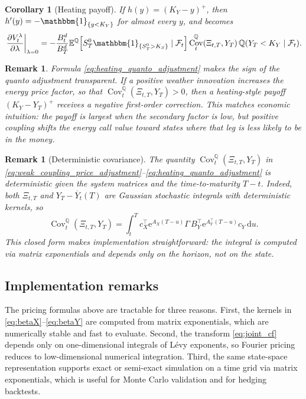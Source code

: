 \documentclass[10pt,a4paper,reqno]{amsart}
\newtheorem{corollary}[theorem]{Corollary}
\newtheorem{remark}[theorem]{Remark}
\newcommand{\E}{\mathbb{E}}
\newcommand{\Q}{\mathbb{Q}}
\newcommand{\F}{\mathcal{F}}
\newcommand{\1}{\mathbbm{1}}
\newcommand{\dd}{\mathrm{d}}
\newcommand{\ee}{\mathrm{e}}
\DeclareMathOperator{\Cov}{Cov}
\begin{document}
\begin{corollary}[Heating payoff]
\label{cor:heating_quanto}
If \(h(y)=(K_Y-y)^+\), then \(h'(y)=-\1_{\{y<K_Y\}}\) for almost every \(y\),
and  becomes
\begin{align}
  \left.\frac{\partial V_t^\lambda}{\partial \lambda}\right|_{\lambda=0}
  = - \frac{B_t^d}{B_T^d}
      \E^\Q\!\left[S_T^0 \1_{\{S_T^0>K_S\}}\mid\F_t\right]
      \Cov_t^\Q(\Xi_{t,T},Y_T)\,
      \Q(Y_T<K_Y\mid\F_t).
      \label{eq:heating_quanto_adjustment}
\end{align}
\end{corollary}

\begin{remark}
Formula \eqref{eq:heating_quanto_adjustment} makes the sign of the quanto
adjustment transparent. If a positive weather innovation increases the energy
price factor, so that \(\Cov_t^\Q(\Xi_{t,T},Y_T)>0\), then a heating-style
payoff \((K_Y-Y_T)^+\) receives a negative first-order correction. This matches
economic intuition: the payoff is largest when the secondary factor is low, but
positive coupling shifts the energy call value toward states where that leg is
less likely to be in the money.
\end{remark}

\begin{remark}[Deterministic covariance]
The quantity \(\Cov_t^\Q(\Xi_{t,T},Y_T)\) in
\eqref{eq:weak_coupling_price_adjustment}--\eqref{eq:heating_quanto_adjustment}
is \emph{deterministic} given the system matrices and the time-to-maturity
\(T-t\). Indeed, both \(\Xi_{t,T}\) and \(Y_T - \overline{Y}_t(T)\) are
Gaussian stochastic integrals with deterministic kernels, so
\[
\Cov_t^\Q(\Xi_{t,T},Y_T)
= \int_t^T c_X^\top \ee^{A_X(T-u)} \Gamma\, B_Y^\top \ee^{A_Y^\top(T-u)} c_Y
  \,\dd u.
\]
This closed form makes implementation straightforward: the integral is
computed via matrix exponentials and depends only on the horizon, not on
the state.
\end{remark}

\subsection{Implementation remarks}

The pricing formulas above are tractable for three reasons. First, the kernels in
\eqref{eq:betaX}--\eqref{eq:betaY} are computed from matrix exponentials, which
are numerically stable and fast to evaluate. Second, the transform
\eqref{eq:joint_cf} depends only on one-dimensional integrals of Lévy exponents,
so Fourier pricing reduces to low-dimensional numerical integration. Third, the
same state-space representation supports exact or semi-exact simulation on a
time grid via matrix exponentials, which is useful for Monte Carlo validation and
for hedging backtests.
\end{document}
